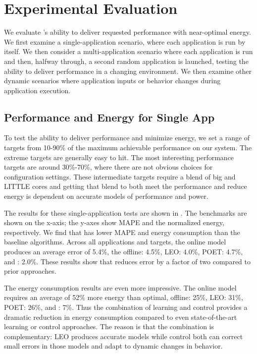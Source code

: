 \section{Experimental Evaluation}
We evaluate \SYSTEM{}'s ability to deliver requested performance with
near-optimal energy.  We first examine a single-application scenario,
where each application is run by itself.  We then consider a
multi-application scenario where each application is run and then,
halfway through, a second random application is launched, testing the
ability to deliver performance in a changing environment.  We then
examine other dynamic scenarios where application inputs or behavior
changes during application execution.

\subsection{Performance and Energy for Single App}
To test the ability to deliver performance and minimize energy, we set
a range of targets from 10-90\% of the maximum achievable performance
on our system. The extreme targets are generally easy to hit. The most
interesting performance targets are around 30\%-70\%, where there are
not obvious choices for configuration settings. These intermediate
targets require a blend of big and LITTLE cores and getting that blend
to both meet the performance and reduce energy is dependent on
accurate models of performance and power.

The results for these single-application tests are shown in
.  The benchmarks are
shown on the x-axis; the y-axes show MAPE and the normalized energy,
respectively.  We find that \SYSTEM{} has lower MAPE and energy
consumption than the baseline algorithms. Across all applications and
targets, the online model produces an average error of 5.4\%, the
offline: 4.5\%, LEO: 4.0\%, POET: 4.7\%, and \SYSTEM{}: 2.0\%.  These
results show that \SYSTEM{} reduces error by a factor of two compared
to prior approaches.

The energy consumption results are even more impressive.  The online
model requires an average of 52\% more energy than optimal, offline:
25\%, LEO: 31\%, POET: 26\%, and \SYSTEM{}: 7\%.  Thus the combination
of learning and control provides a dramatic reduction in energy
consumption compared to even state-of-the-art learning or control
approaches.  The reason is that the combination is complementary: LEO
produces accurate models while control both can correct small errors
in those models and adapt to dynamic changes in behavior.

